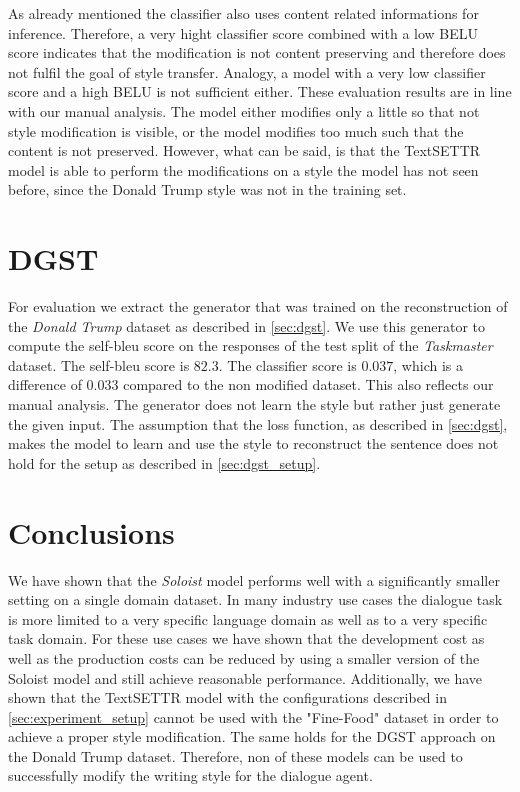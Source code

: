 \documentclass[twocolumn]{tum-article}
\begin{document}
As already mentioned the classifier also uses content related informations for inference. Therefore, a very hight classifier score combined with a low BELU score indicates that the modification is not content preserving and therefore does not fulfil the goal of style transfer. Analogy, a model with a very low classifier score and a high BELU is not sufficient either. These evaluation results are in line with our manual analysis. The model either modifies only a little so that not style modification is visible, or the model modifies too much such that the content is not preserved. However, what can be said, is that the TextSETTR model is able to perform the modifications on a style the model has not seen before, since the Donald Trump style was not in the training set.  
\section{DGST}
For evaluation we extract the generator that was trained on the reconstruction of the \textit{Donald Trump} dataset as described in \autoref{sec:dgst}. We use this generator to compute the self-bleu score on the responses of the test split of the \textit{Taskmaster} dataset. The self-bleu score is $82.3$. The classifier score is $0.037$, which is a difference of $0.033$ compared to the non modified dataset. This also reflects our manual analysis. The generator does not learn the style but rather just generate the given input. The assumption that the loss function, as described in \autoref{sec:dgst}, makes the model to learn and use the style to reconstruct the sentence does not hold for the setup as described in \autoref{sec:dgst_setup}.
\section{Conclusions}
We have shown that the \textit{Soloist} model performs well with a significantly smaller setting on a single domain dataset. In many industry use cases the dialogue task is more limited to a very specific language domain as well as to a very specific task domain. For these use cases we have shown that the development cost as well as the production costs can be reduced by using a smaller version of the Soloist model and still achieve reasonable performance. Additionally, we have shown that the TextSETTR model with the configurations described in \autoref{sec:experiment_setup} cannot be used with the "Fine-Food" dataset in order to achieve a proper style modification. The same holds for the DGST approach on the Donald Trump dataset. Therefore, non of these models can be used to successfully modify the writing style for the dialogue agent.
\end{document}
